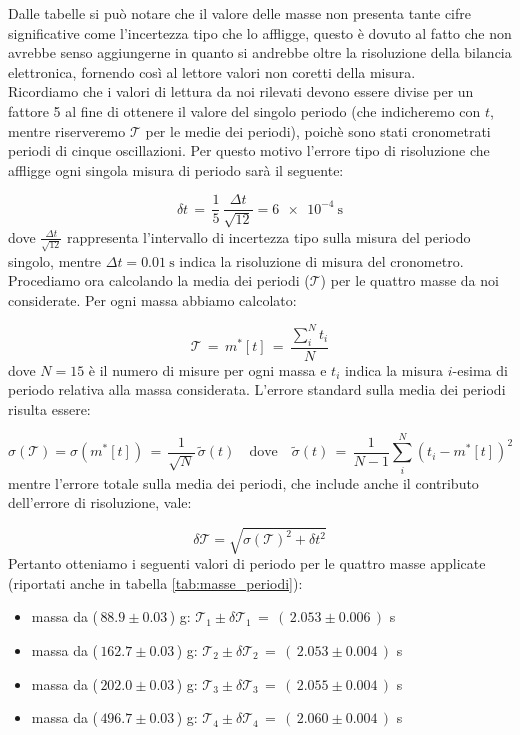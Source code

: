 Dalle tabelle si può notare che il valore delle masse non presenta tante cifre significative come l'incertezza tipo che lo affligge,
questo è dovuto al fatto che non avrebbe senso aggiungerne in quanto si andrebbe oltre la risoluzione della bilancia elettronica,
fornendo così al lettore valori non coretti della misura.\\

Ricordiamo che i valori di lettura da noi rilevati devono essere divise per un fattore 5 al fine di ottenere il valore del singolo periodo
(che indicheremo con $t$, mentre riserveremo $\mathcal{T}$ per le medie dei periodi), poichè sono stati  cronometrati periodi di cinque oscillazioni. Per questo motivo l'errore tipo di risoluzione che affligge ogni singola misura di periodo sarà il seguente:

\begin{equation*}
	\delta t \,=\, \frac{1}{5} \, \frac{\Delta t}{\sqrt{12}} = \SI{6e-4}{\second}
\end{equation*}
%
dove $\frac{\Delta t}{\sqrt{12}}$ rappresenta l'intervallo di incertezza tipo sulla misura del periodo singolo, mentre
$\Delta t = \SI{0.01}{\second}$ indica la risoluzione di misura del cronometro.\\
Procediamo ora calcolando la media dei periodi ($\mathcal{T}$) per le quattro masse da noi considerate. Per ogni massa
abbiamo calcolato:

\begin{equation*}
	\mathcal{T} \,=\, m^*[t] \,=\, \frac{\sum_{i}^{N} t_i}{N}
\end{equation*}
%
dove $N = 15$ è il numero di misure per ogni massa e $t_i$ indica la misura $i$-esima di periodo
relativa alla massa considerata. L'errore standard sulla media dei periodi risulta essere:

\begin{equation*}
    \sigma (\mathcal{T}) = \sigma(m^*[t]) \,=\, \frac{1}{\sqrt{N}} \, \tilde\sigma (t) \quad \text{dove} \quad \tilde\sigma(t)
    \,=\, \frac{1}{N-1} \sum_{i}^{N} (t_i - m^*[t])^2
\end{equation*}
%
mentre l'errore totale sulla media dei periodi, che include anche il contributo dell'errore di risoluzione, vale:

\begin{equation*}
    \delta \mathcal{T} = \sqrt{\sigma (\mathcal{T})^2 + \delta t^2}
\end{equation*}
%
Pertanto otteniamo i seguenti valori di periodo per le quattro masse applicate (riportati anche in tabella \ref{tab:masse_periodi}):
\begin{itemize}
	\item{ massa da ($\,88.9 \pm 0.03\,$) g: $\mathcal{T}_1 \pm \delta\mathcal{T}_1 \,=\, (\,2.053  \pm 0.006\,)$ s}
	\item{ massa da ($\,162.7 \pm 0.03\,$) g: $\mathcal{T}_2 \pm \delta\mathcal{T}_2 \,=\, (\,2.053 \pm 0.004\,)$ s}
	\item{ massa da ($\,202.0 \pm 0.03\,$) g: $\mathcal{T}_3 \pm \delta\mathcal{T}_3 \,=\, (\,2.055 \pm 0.004\,)$ s}
	\item{ massa da ($\,496.7 \pm 0.03\,$) g: $\mathcal{T}_4 \pm \delta\mathcal{T}_4 \,=\, (\,2.060 \pm 0.004\,)$ s}
\end{itemize}

